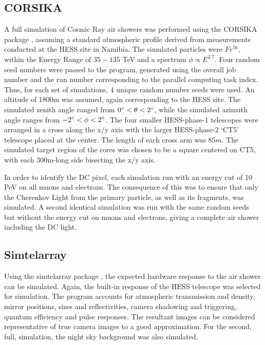 \documentclass{article}
\begin{document}
\subsection{CORSIKA}
A full simulation of Cosmic Ray air showers was performed using the CORSIKA package \cite{Heck98}, assuming a standard atmospheric profile derived from measurements conducted at the HESS site in Namibia. The simulated particles were $Fe^{56}$, within the Energy Range of $35-135$ TeV and a spectrum $\phi \propto E^{2.7}$. Four random seed numbers were passed to the program, generated using the overall job number and the run number corresponding to the parallel computing task index. Thus, for each set of simulations, 4 unique random number seeds were used. An altitude of 1800m was assumed, again corresponding to the HESS site. The simulated zenith angle ranged from $0\degree < \theta < 2 \degree$, while the simulated azimuth angle ranges from $-2\degree < \phi < 2 \degree$. The four smaller HESS-phase-1 telescopes were arranged in a cross along the x/y axis with the larger HESS-phase-2 \textquoteleft CT5' telescope placed at the center. The length of each cross arm was $85m$. The simulated target region of the cores was chosen to be a square centered on CT5, with each 300m-long side bisecting the x/y axis.

In order to identify the DC pixel, each simulation run with an energy cut of 10 PeV on all muons and electrons. The consequence of this was to ensure that only the Cherenkov Light from the primary particle, as well as its fragments, was simulated. A second identical simulation was run with the same random seeds but without the energy cut on muons and electrons, giving a complete air shower including the DC light.

\subsection{Sim\textunderscore telarray}
Using the sim\textunderscore telarray package \cite{Bernlohr08}, the expected hardware response to the air shower can be simulated. Again, the built-in response of the HESS telescope was selected for simulation. The program accounts for atmospheric transmission and density, mirror positions, sizes and reflectivities, camera shadowing and triggering, quantum efficiency and pulse responses. The resultant images can be considered representative of true camera images to a good approximation. For the second, full, simulation, the night sky background was also simulated.
\end{document}
